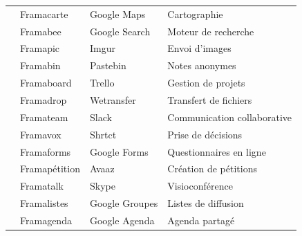 \documentclass[10pt,a4paper]{report}
\begin{document}
\begin{tabular}{|c|l|l|l|}
			\cline{2-4}
			& Framacarte & Google Maps & Cartographie\\ 
			\cline{2-4}
			& Framabee & Google Search & Moteur de recherche \\ 
			\cline{2-4}
			& Framapic & Imgur & Envoi d'images \\ 
			\cline{2-4}
			& Framabin & Pastebin & Notes anonymes \\
			\cline{2-4}
			& Framaboard & Trello & Gestion de projets \\
			\cline{2-4}
			& Framadrop & Wetransfer & Transfert de fichiers \\
			\hline
			\parbox[t]{3mm}{} & Framateam & Slack & Communication collaborative \\
			& Framavox & Shrtct & Prise de décisions \\
			& Framaforms & Google Forms & Questionnaires en ligne \\
			& Framapétition & Avaaz & Création de pétitions \\
			& Framatalk & Skype & Visioconférence \\
			& Framalistes & Google Groupes & Listes de diffusion \\
			& Framagenda & Google Agenda & Agenda partagé \\
			\hline 
			\end{tabular}
	
\end{document}
